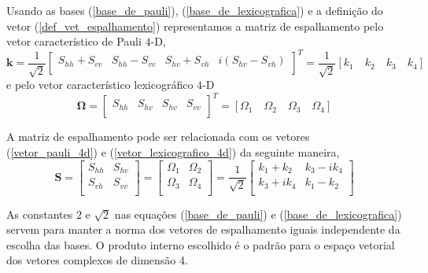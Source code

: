 Usando as bases (\ref{base_de_pauli}), (\ref{base_de_lexicografica}) e  a definição do vetor (\ref{def_vet_espalhamento}) representamos a matriz de espalhamento pelo vetor característico de Pauli $4$-D,
\begin{equation}\label{vetor_pauli_4d}
\mathbf{k}= \frac{1}{\sqrt{2}}\left[
	\begin{array}{cccc}
	S_{hh} + S_{vv}& S_{hh} - S_{vv}& S_{hv} + S_{vh} &i (S_{hv} - S_{vh})   \\
\end{array}\right]^T=\frac{1}{\sqrt{2}}[k_1\quad k_2\quad k_3\quad k_4]
\end{equation}
e pelo vetor característico lexicográfico $4$-D 
\begin{equation}\label{vetor_lexicografico_4d}
\mathbf{\Omega}= \left[
	\begin{array}{cccc}
	S_{hh}& S_{hv} &S_{hv}& S_{vv}   \\
\end{array}\right]^T=[\Omega_1\quad \Omega_2\quad \Omega_3\quad \Omega_4]
\end{equation}

A matriz de espalhamento pode ser relacionada com os vetores (\ref{vetor_pauli_4d}) e (\ref{vetor_lexicografico_4d}) da seguinte maneira,
\begin{equation}\label{mat_esp_rel_pauli_lex}
\mathbf{S} = \left[
\begin{array}{cc}
	S_{hh}   & S_{hv}   \\
	S_{vh}   & S_{vv}   \\
\end{array}
\right]=
\left[
\begin{array}{cc}
	\Omega_1   & \Omega_2   \\
	\Omega_3   & \Omega_4   \\
\end{array}
\right]=\frac{1}{\sqrt{2}}
\left[
\begin{array}{cc}
	 k_1+k_2  & k_3-ik_4   \\
	 k_3+ik_4 & k_1-k_2   \\
\end{array}
\right]
\end{equation}

As constantes $2$ e $\sqrt{2}$ nas equações (\ref{base_de_pauli}) e (\ref{base_de_lexicografica}) servem para manter a norma dos vetores de espalhamento iguais independente da escolha das bases. O produto interno escolhido é o padrão para o espaço vetorial dos vetores complexos de dimensão 4.

